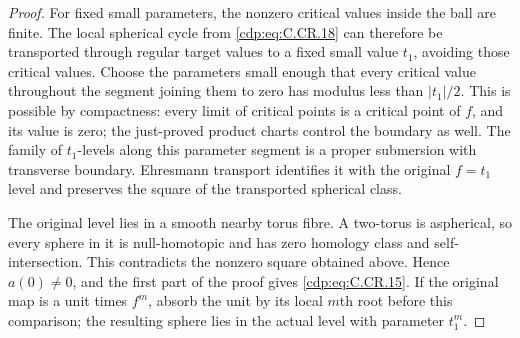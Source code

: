 \begin{proof}
For fixed small parameters, the nonzero critical
values inside the ball are finite. The local
spherical cycle from \eqref{cdp:eq:C.CR.18} can therefore be transported
through regular target values to a fixed small
value $t_1$, avoiding those critical values.
Choose the parameters small enough that every
critical value throughout the segment joining
them to zero has modulus less than $|t_1|/2$.
This is possible by compactness: every limit of
critical points is a critical point of $f$, and
its value is zero; the just-proved product charts
control the boundary as well. The family of
$t_1$-levels along this parameter segment is a
proper submersion with transverse boundary.
Ehresmann transport identifies it with the
original $f=t_1$ level and preserves the square
of the transported spherical class.

The original level lies in a smooth nearby torus
fibre. A two-torus is aspherical, so every sphere
in it is null-homotopic and has zero homology
class and self-intersection. This contradicts
the nonzero square obtained above. Hence $a(0)\ne0$,
and the first part of the proof gives \eqref{cdp:eq:C.CR.15}.
If the original map is a unit times $f^m$, absorb
the unit by its local $m$th root before this
comparison; the resulting sphere lies in the
actual level with parameter $t_1^m$.
\end{proof}


